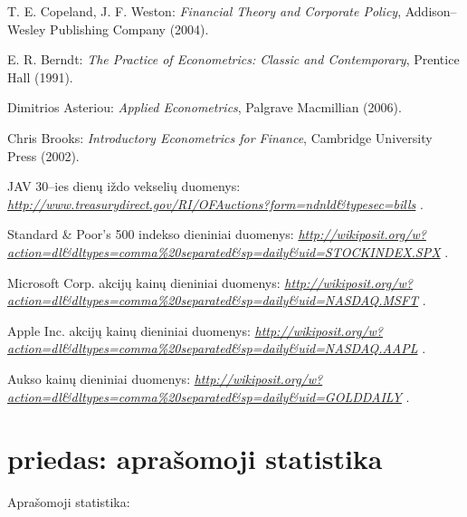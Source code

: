 \documentclass[12pt, a14paper, lithuanian]{article}
\begin{document}
\newpage
{}

\begin{thebibliography}{99}
\label{mySection}
 T. E. Copeland, J. F. Weston:
\emph{Financial Theory and Corporate Policy},
Addison--Wesley Publishing Company (2004).

 E. R. Berndt:
\emph{The Practice of Econometrics: Classic and Contemporary},
Prentice Hall (1991).

 Dimitrios Asteriou:
\emph{Applied Econometrics},
Palgrave Macmillian (2006).

 Chris Brooks:
\emph{Introductory Econometrics for Finance},
Cambridge University Press (2002).

 JAV 30--ies dienų iždo vekselių duomenys:
\emph{ \url{http://www.treasurydirect.gov/RI/OFAuctions?form=ndnld&typesec=bills} }.

 Standard & Poor's 500 indekso dieniniai duomenys:
\emph{ \url{http://wikiposit.org/w?action=dl\&dltypes=comma\%20separated\&sp=daily\&uid=STOCKINDEX.SPX} }.

 Microsoft Corp. akcijų kainų dieniniai duomenys:
\emph{ \url{http://wikiposit.org/w?action=dl\&dltypes=comma\%20separated\&sp=daily\&uid=NASDAQ.MSFT} }.

 Apple Inc. akcijų kainų dieniniai duomenys:
\emph{ \url{http://wikiposit.org/w?action=dl\&dltypes=comma\%20separated\&sp=daily\&uid=NASDAQ.AAPL} }.

 Aukso kainų dieniniai duomenys:
\emph{ \url{http://wikiposit.org/w?action=dl\&dltypes=comma\%20separated\&sp=daily\&uid=GOLDDAILY} }.

\end{thebibliography}


\newpage

\appendix

\section{priedas: aprašomoji statistika}
\label{A 1}
Aprašomoji statistika:
\end{document}
